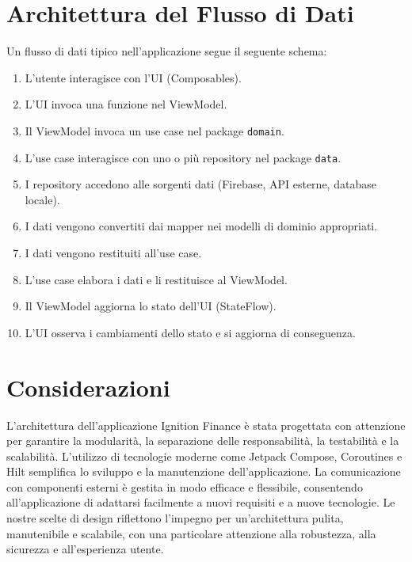 \documentclass{article}
\begin{document}
\section{Architettura del Flusso di
Dati}\label{sec:architettura-del-flusso-di-dati}

Un flusso di dati tipico nell'applicazione segue il seguente schema:

\begin{enumerate}
\item L'utente interagisce con l'UI (Composables).
\item L'UI invoca una funzione nel ViewModel.
\item Il ViewModel invoca un use case nel package \texttt{domain}.
\item L'use case interagisce con uno o più repository nel package \texttt{data}.
\item I repository accedono alle sorgenti dati (Firebase, API esterne, database
locale).
\item I dati vengono convertiti dai mapper nei modelli di dominio appropriati.
\item I dati vengono restituiti all'use case.
\item L'use case elabora i dati e li restituisce al ViewModel.
\item Il ViewModel aggiorna lo stato dell'UI (StateFlow).
\item L'UI osserva i cambiamenti dello stato e si aggiorna di conseguenza.
\end{enumerate}

\section{Considerazioni}\label{sec:considerazioni}

L'architettura dell'applicazione Ignition Finance è stata progettata con
attenzione per garantire la modularità, la separazione delle responsabilità, la
testabilità e la scalabilità.
L'utilizzo di tecnologie moderne come Jetpack
Compose, Coroutines e Hilt semplifica lo sviluppo e la manutenzione
dell'applicazione.
La comunicazione con componenti esterni è gestita in modo
efficace e flessibile, consentendo all'applicazione di adattarsi facilmente a
nuovi requisiti e a nuove tecnologie.
Le nostre scelte di design riflettono
l'impegno per un'architettura pulita, manutenibile e scalabile, con una
particolare attenzione alla robustezza, alla sicurezza e all'esperienza utente.
\vspace{7cm}
\end{document}
